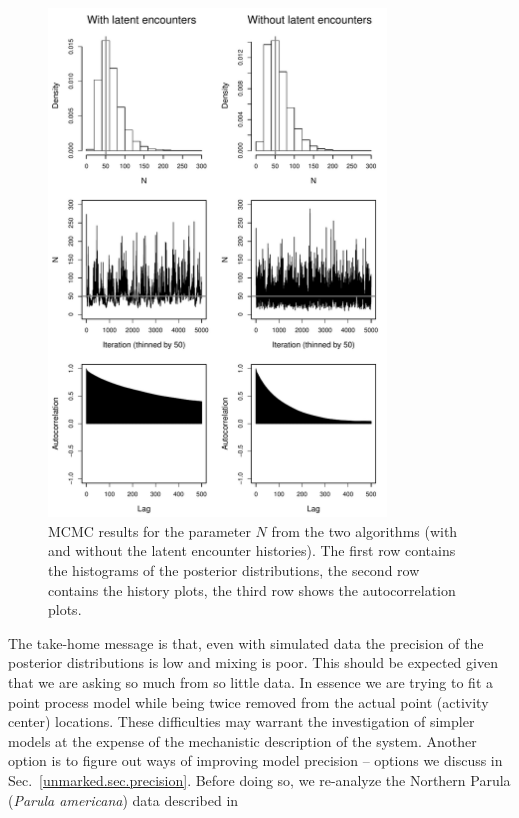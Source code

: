 \begin{figure}
  \centering
  \includegraphics[width=0.8\textwidth]{Ch18-Unmarked/figs/mc1mc2}
  \caption{MCMC results for the parameter $N$ from the two algorithms
    (with and without the latent encounter histories). The first
    row contains the histograms of the posterior distributions, the second row
    contains the history plots, the third row shows the
    autocorrelation plots.}
  \label{unmarked.fig.Nsim}
\end{figure}


The take-home message is that, even with simulated data
the precision of the posterior distributions is
low and mixing is poor. This should be expected given that we are
asking so much from so little data. In essence we are trying to fit a
point process model while being twice removed from the actual point
(activity center) locations. These difficulties may warrant the investigation of simpler
models at the expense of the mechanistic description of the system. Another option is to
figure out ways of improving model precision -- options we discuss in
Sec.~\ref{unmarked.sec.precision}. Before doing so, we re-analyze the
Northern Parula ({\it Parula americana}) data
described in \citet{chandler_royle:2012}


